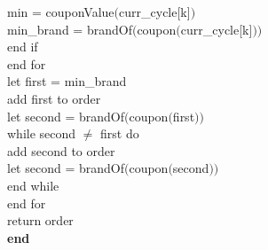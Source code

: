 \documentclass{article}
\begin{document}
      \indent \indent \indent min = couponValue$($curr\_cycle[k]$)$\\
      \indent \indent \indent min\_brand = brandOf$($coupon$($curr\_cycle[k]$))$\\
      \indent \indent end if\\
      \indent end for\\
      \indent let first = min\_brand\\
      \indent add first to order\\
      \indent let second = brandOf$($coupon$($first$))$\\
      \indent while second $\neq$ first do\\
      \indent \indent add second to order\\
      \indent \indent let second = brandOf$($coupon$($second$))$\\
      \indent end while\\
      end for\\
      return order\\
      \textbf{end}\\
\end{document}
